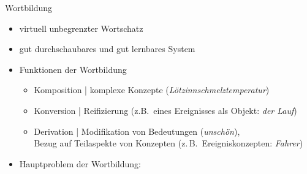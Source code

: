 \begin{frame}
  {Wortbildung}
  \onslide<+->
  \begin{itemize}[<+->]
    \item virtuell unbegrenzter Wortschatz
      \Zeile
    \item gut durchschaubares und \alert{gut lernbares} System\\
      \Zeile
    \item Funktionen der Wortbildung
      \begin{itemize}
        \item Komposition | \alert{komplexe Konzepte} (\textit{Lötzinnschmelztemperatur})
        \item Konversion | \alert{Reifizierung} (z.B.\ eines Ereignisses als Objekt: \textit{der Lauf})
        \item Derivation | \alert{Modifikation von Bedeutungen} (\textit{\alert{un}schön}),\\
          \alert{Bezug auf Teilaspekte von Konzepten} (z.\,B.\ Ereigniskonzepten: \textit{Fahr\alert{er}})
      \end{itemize}
      \Halbzeile
    \item Hauptproblem der Wortbildung:\\
  \end{itemize}
\end{frame}

